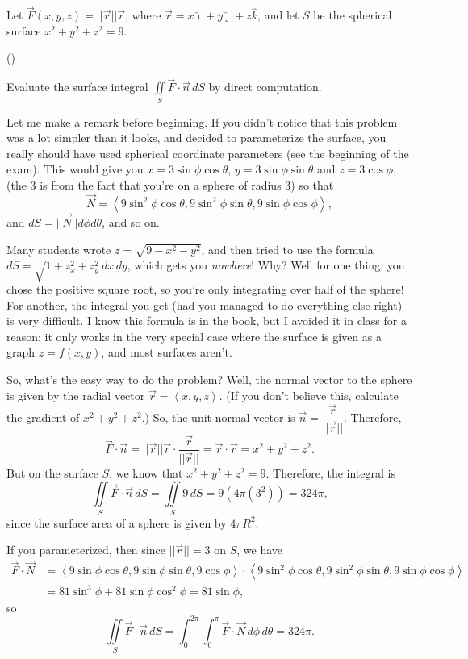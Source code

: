 \documentclass[letter, 12pt]{article}
\newcounter{probnum}
\newcounter{subprobnum}
\newenvironment{problems}{
\begin{list}{\arabic{probnum}.}{\usecounter{probnum}}
}{
\end{list}
}
\newenvironment{subproblem}{ %
\begin{list}{ %
(\alph{subprobnum})
}{ %
\usecounter{subprobnum}
\setlength{\topsep}{0in}
} %
}{ %
\end{list}
}
\begin{document}
\begin{problems}
\item Let $\vec{F}(x,y,z) = ||\vec{r}||\vec{r}$, where $\vec{r} = x\hat{\imath} + y\hat{\jmath} + z\hat{k}$, and let $S$ be the spherical surface $x^2+y^2+z^2 = 9$.
\begin{subproblem}
\item Evaluate the surface integral $\displaystyle \iint\limits_S \vec{F}\cdot\vec{n}\,dS$ by direct computation. \marginpar{[6]}

\bigskip

Let me make a remark before beginning.  If you didn't notice that this problem was a lot simpler than it looks, and decided to parameterize the surface, you really should have used spherical coordinate parameters (see the beginning of the exam).  This would give you $x = 3\sin\phi\cos\theta$, $y = 3\sin\phi\sin\theta$ and $z = 3\cos\phi$, (the 3 is from the fact that you're on a sphere of radius 3) so that
\[\vec{N} = \left<9\sin^2\phi\cos\theta,9\sin^2\phi\sin\theta,9\sin\phi\cos\phi\right>,\]
and $dS = ||\vec{N}||d\phi d\theta$, and so on.

\medskip

Many students wrote $z = \sqrt{9-x^2-y^2}$, and then tried to use the formula $dS = \sqrt{1+z_x^2+z_y^2}\,dx\,dy$, which gets you {\em nowhere}!  Why?  Well for one thing, you chose the positive square root, so you're only integrating over half of the sphere!  For another, the integral you get (had you managed to do everything else right) is very difficult.  I know this formula is in the book, but I avoided it in class for a reason: it only works in the very special case where the surface is given as a graph $z = f(x,y)$, and most surfaces aren't. 

\medskip

So, what's the easy way to do the problem?  Well, the normal vector to the sphere is given by the radial vector $\vec{r} = \left<x,y,z\right>$.  (If you don't believe this, calculate the gradient of $x^2+y^2+z^2$.)  So, the unit normal vector is $\vec{n} = \dfrac{\vec{r}}{||\vec{r}||}$.  Therefore,
\[\vec{F}\cdot\vec{n} = ||\vec{r}||\vec{r}\cdot \frac{\vec{r}}{||\vec{r}||} = \vec{r}\cdot\vec{r} = x^2+y^2+z^2.\]
But on the surface $S$, we know that $x^2+y^2+z^2 = 9$.  Therefore, the integral is
\[\iint\limits_S\vec{F}\cdot\vec{n}\,dS = \iint\limits_S 9\,dS = 9(4\pi(3^2)) = 324\pi,\]
since the surface area of a sphere is given by $4\pi R^2$.

\medskip

If you parameterized, then since $||\vec{r}||=3$ on $S$, we have
\begin{align*}
\vec{F}\cdot\vec{N} &= \left<9\sin\phi\cos\theta,9\sin\phi\sin\theta,9\cos\phi\right>\cdot \left<9\sin^2\phi\cos\theta,9\sin^2\phi\sin\theta,9\sin\phi\cos\phi\right>\\
& = 81\sin^3\phi + 81\sin\phi\cos^2\phi = 81\sin\phi,
\end{align*}
so
\[\iint\limits_S \vec{F}\cdot\vec{n}\,dS = \int_0^{2\pi}\int_0^\pi \vec{F}\cdot\vec{N}\,d\phi\,d\theta = 324\pi.\]
\newpage
{}


\end{subproblem}
\end{problems}
\end{document}
